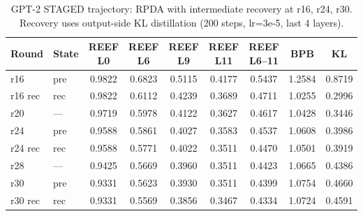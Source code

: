 \begin{table}[t]
\centering
\caption{GPT-2 STAGED trajectory: RPDA with intermediate recovery at r16, r24, r30. Recovery uses output-side KL distillation (200 steps, lr=3e-5, last 4 layers).}
\label{tab:gpt2_staged}
\small
\begin{tabular}{llccccccc}
\toprule
Round & State & \thead{REEF\\L0} & \thead{REEF\\L6} & \thead{REEF\\L9} & \thead{REEF\\L11} & \thead{REEF\\L6--11} & BPB & KL \\
\midrule
  r16 & pre & 0.9822 & 0.6823 & 0.5115 & 0.4177 & 0.5437 & 1.2584 & 0.8719 \\
  r16 rec & rec & 0.9822 & 0.6112 & 0.4239 & 0.3689 & 0.4711 & 1.0255 & 0.2996 \\
  r20 & — & 0.9719 & 0.5978 & 0.4122 & 0.3627 & 0.4617 & 1.0428 & 0.3446 \\
  r24 & pre & 0.9588 & 0.5861 & 0.4027 & 0.3583 & 0.4537 & 1.0608 & 0.3986 \\
  r24 rec & rec & 0.9588 & 0.5771 & 0.4022 & 0.3511 & 0.4470 & 1.0501 & 0.3919 \\
  r28 & — & 0.9425 & 0.5669 & 0.3960 & 0.3511 & 0.4423 & 1.0665 & 0.4386 \\
  r30 & pre & 0.9331 & 0.5623 & 0.3930 & 0.3511 & 0.4399 & 1.0754 & 0.4660 \\
  r30 rec & rec & 0.9331 & 0.5569 & 0.3856 & 0.3467 & 0.4334 & 1.0724 & 0.4591 \\
\bottomrule
\end{tabular}
\end{table}